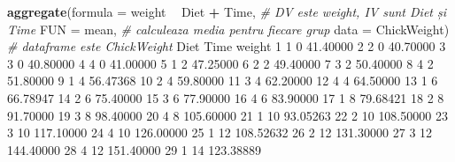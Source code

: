 \documentclass[]{article}
\newenvironment{Shaded}{\begin{snugshade}}{\end{snugshade}}
\newcommand{\CommentTok}[1]{\textcolor[rgb]{0.56,0.35,0.01}{\textit{#1}}}
\newcommand{\DataTypeTok}[1]{\textcolor[rgb]{0.13,0.29,0.53}{#1}}
\newcommand{\DecValTok}[1]{\textcolor[rgb]{0.00,0.00,0.81}{#1}}
\newcommand{\FloatTok}[1]{\textcolor[rgb]{0.00,0.00,0.81}{#1}}
\newcommand{\KeywordTok}[1]{\textcolor[rgb]{0.13,0.29,0.53}{\textbf{#1}}}
\newcommand{\NormalTok}[1]{#1}
\newcommand{\OperatorTok}[1]{\textcolor[rgb]{0.81,0.36,0.00}{\textbf{#1}}}
\newcommand{\StringTok}[1]{\textcolor[rgb]{0.31,0.60,0.02}{#1}}
\begin{document}
\begin{Shaded}
\begin{Highlighting}[]
\KeywordTok{aggregate}\NormalTok{(}\DataTypeTok{formula =}\NormalTok{ weight }\OperatorTok{~}\StringTok{ }\NormalTok{Diet }\OperatorTok{+}\StringTok{ }\NormalTok{Time,  }\CommentTok{# DV este weight, IV sunt Diet și Time}
          \DataTypeTok{FUN =}\NormalTok{ mean,               }\CommentTok{# calculeaza media pentru fiecare grup}
          \DataTypeTok{data =}\NormalTok{ ChickWeight)       }\CommentTok{# dataframe este ChickWeight}
\NormalTok{   Diet Time    weight}
\DecValTok{1}     \DecValTok{1}    \DecValTok{0}  \FloatTok{41.40000}
\DecValTok{2}     \DecValTok{2}    \DecValTok{0}  \FloatTok{40.70000}
\DecValTok{3}     \DecValTok{3}    \DecValTok{0}  \FloatTok{40.80000}
\DecValTok{4}     \DecValTok{4}    \DecValTok{0}  \FloatTok{41.00000}
\DecValTok{5}     \DecValTok{1}    \DecValTok{2}  \FloatTok{47.25000}
\DecValTok{6}     \DecValTok{2}    \DecValTok{2}  \FloatTok{49.40000}
\DecValTok{7}     \DecValTok{3}    \DecValTok{2}  \FloatTok{50.40000}
\DecValTok{8}     \DecValTok{4}    \DecValTok{2}  \FloatTok{51.80000}
\DecValTok{9}     \DecValTok{1}    \DecValTok{4}  \FloatTok{56.47368}
\DecValTok{10}    \DecValTok{2}    \DecValTok{4}  \FloatTok{59.80000}
\DecValTok{11}    \DecValTok{3}    \DecValTok{4}  \FloatTok{62.20000}
\DecValTok{12}    \DecValTok{4}    \DecValTok{4}  \FloatTok{64.50000}
\DecValTok{13}    \DecValTok{1}    \DecValTok{6}  \FloatTok{66.78947}
\DecValTok{14}    \DecValTok{2}    \DecValTok{6}  \FloatTok{75.40000}
\DecValTok{15}    \DecValTok{3}    \DecValTok{6}  \FloatTok{77.90000}
\DecValTok{16}    \DecValTok{4}    \DecValTok{6}  \FloatTok{83.90000}
\DecValTok{17}    \DecValTok{1}    \DecValTok{8}  \FloatTok{79.68421}
\DecValTok{18}    \DecValTok{2}    \DecValTok{8}  \FloatTok{91.70000}
\DecValTok{19}    \DecValTok{3}    \DecValTok{8}  \FloatTok{98.40000}
\DecValTok{20}    \DecValTok{4}    \DecValTok{8} \FloatTok{105.60000}
\DecValTok{21}    \DecValTok{1}   \DecValTok{10}  \FloatTok{93.05263}
\DecValTok{22}    \DecValTok{2}   \DecValTok{10} \FloatTok{108.50000}
\DecValTok{23}    \DecValTok{3}   \DecValTok{10} \FloatTok{117.10000}
\DecValTok{24}    \DecValTok{4}   \DecValTok{10} \FloatTok{126.00000}
\DecValTok{25}    \DecValTok{1}   \DecValTok{12} \FloatTok{108.52632}
\DecValTok{26}    \DecValTok{2}   \DecValTok{12} \FloatTok{131.30000}
\DecValTok{27}    \DecValTok{3}   \DecValTok{12} \FloatTok{144.40000}
\DecValTok{28}    \DecValTok{4}   \DecValTok{12} \FloatTok{151.40000}
\DecValTok{29}    \DecValTok{1}   \DecValTok{14} \FloatTok{123.38889}

\end{Highlighting}
\end{Shaded}
\end{document}

